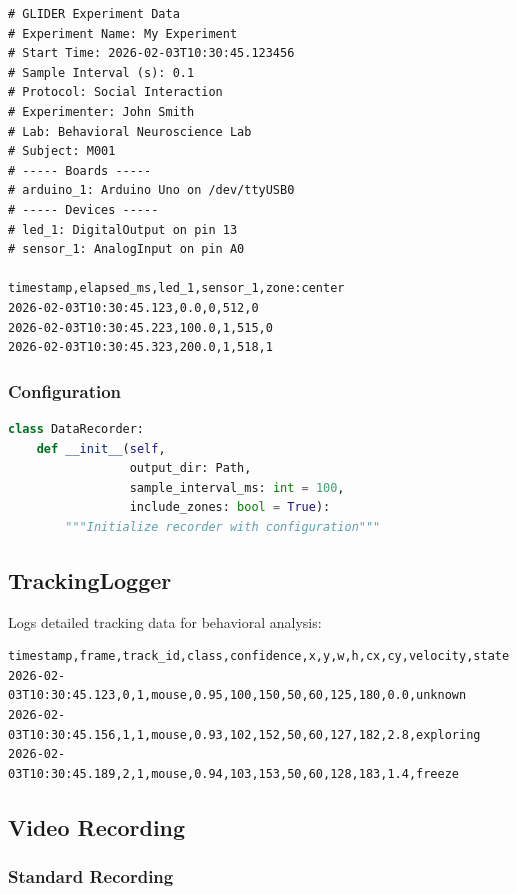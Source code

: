 \documentclass[11pt,a4paper]{article}
\begin{document}
\begin{lstlisting}
# GLIDER Experiment Data
# Experiment Name: My Experiment
# Start Time: 2026-02-03T10:30:45.123456
# Sample Interval (s): 0.1
# Protocol: Social Interaction
# Experimenter: John Smith
# Lab: Behavioral Neuroscience Lab
# Subject: M001
# ----- Boards -----
# arduino_1: Arduino Uno on /dev/ttyUSB0
# ----- Devices -----
# led_1: DigitalOutput on pin 13
# sensor_1: AnalogInput on pin A0

timestamp,elapsed_ms,led_1,sensor_1,zone:center
2026-02-03T10:30:45.123,0.0,0,512,0
2026-02-03T10:30:45.223,100.0,1,515,0
2026-02-03T10:30:45.323,200.0,1,518,1
\end{lstlisting}

\subsubsection{Configuration}

\begin{lstlisting}[language=Python]
class DataRecorder:
    def __init__(self,
                 output_dir: Path,
                 sample_interval_ms: int = 100,
                 include_zones: bool = True):
        """Initialize recorder with configuration"""
\end{lstlisting}

\subsection{TrackingLogger}

Logs detailed tracking data for behavioral analysis:

\begin{lstlisting}
timestamp,frame,track_id,class,confidence,x,y,w,h,cx,cy,velocity,state
2026-02-03T10:30:45.123,0,1,mouse,0.95,100,150,50,60,125,180,0.0,unknown
2026-02-03T10:30:45.156,1,1,mouse,0.93,102,152,50,60,127,182,2.8,exploring
2026-02-03T10:30:45.189,2,1,mouse,0.94,103,153,50,60,128,183,1.4,freeze
\end{lstlisting}

\subsection{Video Recording}

\subsubsection{Standard Recording}
\end{document}
